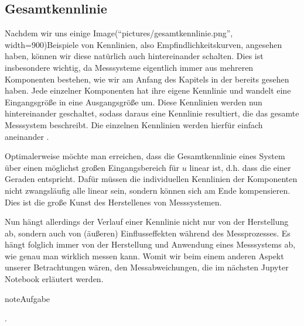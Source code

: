 \documentclass[letterpaper,10pt,english]{jupyterBook}
\begin{document}
\sphinxAtStartPar
{}


\subsection{Gesamtkennlinie}
\label{\detokenize{content/2_realeKennlinie:gesamtkennlinie}}
\sphinxAtStartPar


\sphinxAtStartPar
Nachdem wir uns einige Image(“pictures/gesamtkennlinie.png”, width=900)Beispiele von Kennlinien, also Empfindlichkeitskurven, angesehen haben, können wir diese natürlich auch hintereinander schalten. Dies ist insbesondere wichtig, da Messsysteme eigentlich immer aus mehreren Komponenten bestehen, wie wir am Anfang des Kapitels in der  bereits gesehen haben.
Jede einzelner Komponenten hat ihre eigene Kennlinie und wandelt eine Eingangsgröße in eine Ausgangsgröße um.
Diese Kennlinien werden nun hintereinander geschaltet, sodass daraus eine Kennlinie resultiert, die das gesamte Messsystem beschreibt. Die einzelnen Kennlinien werden hierfür einfach aneinander .

\sphinxAtStartPar
{}

\sphinxAtStartPar
Optimalerweise möchte man erreichen, dass die Gesamtkennlinie eines System über einen möglichst großen Eingangsbereich für \(u\) linear ist, d.h. dass die einer Geraden entspricht. Dafür müssen die individuellen Kennlinien der Komponenten nicht zwangsläufig alle linear sein, sondern können sich am Ende kompensieren. Dies ist die große Kunst des Herstellenes von Messsystemen.

\sphinxAtStartPar
Nun hängt allerdings der Verlauf einer Kennlinie nicht nur von der Herstellung ab, sondern auch von (äußeren) Einflusseffekten während des Messprozesses. Es hängt folglich immer von der Herstellung und Anwendung eines Messsystems ab, wie genau man wirklich messen kann. Womit wir beim einem anderen Aspekt unserer Betrachtungen wären, den Messabweichungen, die im nächsten Jupyter Notebook erläutert werden.

\begin{sphinxadmonition}{note}{Aufgabe}

\sphinxAtStartPar
{}.
\end{sphinxadmonition}
\end{document}
